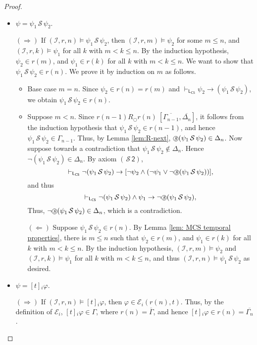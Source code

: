 \documentclass[envcountsect,envcountsame,oribibl,orivec]{llncs}
\newcommand*\circled[1]{\tikz[baseline=(char.base)]{
		\node[shape=circle,draw,inner sep=0.4pt] (char) {#1};}}
\newcommand{\lnext}{\bigcirc}
\newcommand{\lsince}{{\,\mathcal{S}\,}}
\newcommand{\sprevious}{\circled{\textit{s}}}
\newcommand{\stwoax}{\ensuremath{(\lsince\textsf{2})}}
\newcommand{\jbox}[1]{\left[#1\right]\!}
\newcommand{\CS}{\textsf{CS}}
\newcommand{\agent}{i}
\newcommand{\system}{\mathcal{I}}
\newcommand{\evidence}{\mathcal{E}}
\renewcommand{\phi}{\varphi}
\newcommand{\RO}[4]{#1 R_\lnext #2\ [#3, #4]}
\begin{document}
\begin{proof}
\begin{itemize}
		\item $\psi = \psi_1 \lsince \psi_2$. 
		
		$(\Rightarrow)$ If $(\system, r, n) \models \psi_1 \lsince \psi_2$, then $(\system, r, m) \models \psi_2$ for some $m \leq n$, and $(\system, r, k) \models \psi_1$ for all $k$ with $m < k \leq n$. By the induction hypothesis, $\psi_2 \in r(m)$, and $\psi_1 \in r(k)$ for all $k$ with $m < k \leq n$. We want to show that $\psi_1 \lsince \psi_2 \in r(n)$. We prove it by induction on $m$ as follows.
		\begin{itemize}
			\item 		Base case $m=n$. Since $\psi_2 \in r(n)=r(m)$ and $\vdash_{\mathsf{L}_\CS}  \psi_2 \rightarrow (\psi_1 \lsince \psi_2)$, we obtain $\psi_1 \lsince \psi_2 \in r(n)$. 
			
			\item 		Suppose $m < n$. Since $\RO{r(n-1)}{r(n)}{\overline{\Gamma_{n-1}}}{\overline{\Delta_{n}}}$, it follows from the induction hypothesis that $\psi_1 \lsince \psi_2 \in r(n-1)$, and hence $\psi_1 \lsince \psi_2 \in \Gamma_{n-1}$. Thus, by Lemma \ref{lem:R-next}, $\sprevious (\psi_1 \lsince \psi_2) \in \Delta_n$. Now suppose towards a contradiction that $\psi_1 \lsince \psi_2 \not\in \Delta_n$. Hence $\neg(\psi_1 \lsince \psi_2) \in \Delta_n$. By axiom  $\stwoax$,
			\[\vdash_{\mathsf{L}_\CS}  \neg (\psi_1 \lsince \psi_2) \rightarrow [\neg \psi_2 \wedge (\neg \psi_1 \vee \neg \sprevious (\psi_1 \lsince \psi_2))], \]
			and thus 
			\[\vdash_{\mathsf{L}_\CS}  \neg (\psi_1 \lsince \psi_2) \wedge \psi_1 \rightarrow \neg \sprevious (\psi_1 \lsince \psi_2), \]
			Thus, $\neg \sprevious (\psi_1 \lsince \psi_2) \in \Delta_n$, which is a contradiction.
			
			$(\Leftarrow)$ Suppose $\psi_1 \lsince \psi_2 \in r(n)$. By Lemma \ref{lem: MCS temporal properties}, there is $m \leq n$ such that $\psi_2 \in r(m)$, and $\psi_1 \in r(k)$ for all $k$ with $m < k \leq n$. By the induction hypothesis, $(\system, r, m) \models \psi_2$ and $(\system, r, k) \models \psi_1$ for all $k$ with $m < k \leq n$, and thus $(\system, r, n) \models \psi_1 \lsince \psi_2$ as desired. 
		\end{itemize}
		
		
		\item $\psi = \jbox{t}_\agent \phi$.
		
		$(\Rightarrow)$ If $(\system, r, n) \models \jbox{t}_\agent \phi$, then $\phi \in \evidence_\agent (r(n),t)$. Thus, by the definition of $\evidence_\agent$, $\jbox{t}_\agent \phi \in \Gamma$, where $r(n) = \overline{\Gamma}$, and hence $\jbox{t}_\agent \phi \in r(n)= \overline{\Gamma_n}$. 
		

\end{itemize}
\end{proof}
\end{document}
